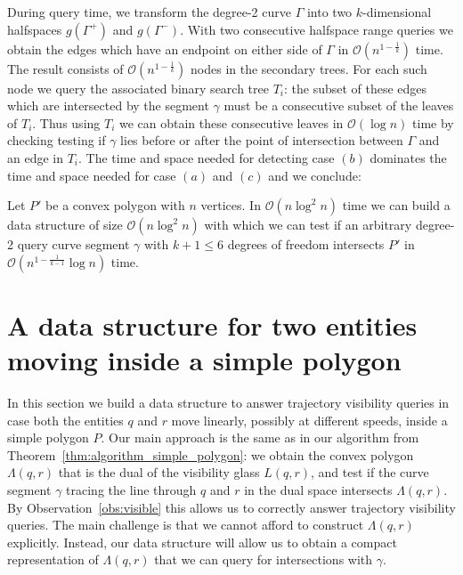 \documentclass[UKenglish]{lipics-v2019}
\newcommand{\mkmcal}[1]{\ensuremath{\mathcal{#1}}\xspace}
\renewcommand{\O}{\mkmcal{O}}
\begin{document}
During query time, we transform the degree-2 curve $\Gamma$ into two
$k$-dimensional halfspaces $g(\Gamma^+)$ and $g(\Gamma^-)$. With two
consecutive halfspace range queries we obtain the edges which have an
endpoint on either side of $\Gamma$ in $\mathcal{O}(n^ {1 -
  \frac{1}{k}})$ time. The result consists of $\mathcal{O}(n^ {1 -
  \frac{1}{k}})$ nodes in the secondary trees. For each such node we query
the associated binary search tree $T_i$: the subset of these edges
which are intersected by the segment $\gamma$ must be a consecutive subset of the leaves of $T_i$. 
Thus using $T_i$ we can obtain these consecutive leaves in $\mathcal{O}(\log n)$ time by checking testing if $\gamma$ lies before or after the point of intersection between $\Gamma$ and an edge in $T_i$.
The time and space needed for detecting case $(b)$ dominates the time and space needed for case $(a)$ and $(c)$ and we conclude:

\begin{theorem}
  \label{thm:intersect_convex_polygon}
  Let $P'$ be a convex polygon with $n$ vertices. In $\O(n\log^2 n)$ time we can
  build a data structure of size $\O(n\log^2 n)$ with which we can test if an
  arbitrary degree-2 query curve segment $\gamma$ with $k+1 \le 6$ degrees of freedom
  intersects $P'$ in $\O(n^{1 - \frac{1}{k-1}}\log n)$ time.
\end{theorem}




\section{A data structure for two entities moving inside a simple polygon}
\label{sec:lineline}


In this section we build a data structure to answer trajectory visibility
queries in case both the entities $q$ and $r$ move linearly, possibly at
different speeds, inside a simple polygon $P$. Our main approach is the same as
in our algorithm from Theorem~\ref{thm:algorithm_simple_polygon}: we obtain the
convex polygon $\Lambda(q,r)$ that is the dual of the visibility glass
$L(q,r)$, and test if the curve segment $\gamma$ tracing the line through $q$
and $r$ in the dual space intersects $\Lambda(q,r)$. By
Observation~\ref{obs:visible} this allows us to correctly answer trajectory
visibility queries. The main challenge is that we cannot afford to construct
$\Lambda(q,r)$ explicitly. Instead, our data structure will allow us to obtain
a compact representation of $\Lambda(q,r)$ that we can query for intersections
with $\gamma$.
\end{document}
